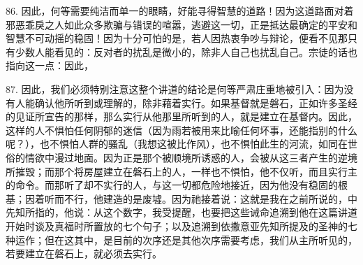 86. 因此，何等需要纯洁而单一的眼睛，好能寻得智慧的道路！因为这道路面对着邪恶乖戾之人如此众多欺骗与错误的喧嚣，逃避这一切，正是抵达最确定的平安和智慧不可动摇的稳固！因为十分可怕的是，若人因热衷争吵与辩论，便看不见那只有少数人能看见的：反对者的扰乱是微小的，除非人自己也扰乱自己。宗徒的话也指向这一点：因此，\par

87. 因此，我们必须特别注意这整个讲道的结论是何等严肃庄重地被引入：因为没有人能确认他所听到或理解的，除非藉着实行。如果基督就是磐石，正如许多圣经的见证所宣告的那样，那么实行从他那里所听到的人，就是建立在基督内。因此，这样的人不惧怕任何阴郁的迷信（因为雨若被用来比喻任何坏事，还能指别的什么呢？），也不惧怕人群的骚乱（我想这被比作风），也不惧怕此生的河流，如同在世俗的情欲中漫过地面。因为正是那个被顺境所诱惑的人，会被从这三者产生的逆境所摧毁；而那个将房屋建立在磐石上的人，一样也不惧怕，他不仅听，而且实行主的命令。而那听了却不实行的人，与这一切都危险地接近，因为他没有稳固的根基；因着听而不行，他建造的是废墟。因为祂接着说：这就是我在之前所说的，中先知所指的，他说：从这个数字，我受提醒，也要把这些诫命追溯到他在这篇讲道开始时谈及真福时所置放的七个句子；以及追溯到依撒意亚先知所提及的圣神的七种运作；但在这其中，是目前的次序还是其他次序需要考虑，我们从主所听见的，若要建立在磐石上，就必须去实行。\par

